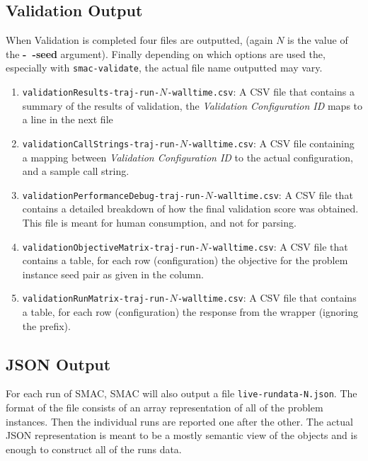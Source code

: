 \documentclass[manual.tex]{subfiles}
\begin{document}
\subsection{Validation Output}

When Validation is completed four files are outputted, (again $N$ is the value of the \textbf{-~$\!\!$-seed} argument). Finally depending on which options are used the, especially with \texttt{smac-validate}, the actual file name outputted may vary.

\begin{enumerate}
\item \texttt{validationResults-traj-run-$N$-walltime.csv}:
A CSV file that contains a summary of the results of validation, the \textit{Validation Configuration ID} maps to a line in the next file

\item \texttt{validationCallStrings-traj-run-$N$-walltime.csv}:
A CSV file containing a mapping between \textit{Validation Configuration ID} to
the actual configuration, and a sample call string.

\item \texttt{validationPerformanceDebug-traj-run-$N$-walltime.csv}:
A CSV file that contains a detailed breakdown of how the final validation score
was obtained. This file is meant for human consumption, and not for parsing.

\item \texttt{validationObjectiveMatrix-traj-run-$N$-walltime.csv}:
A CSV file that contains a table, for each row (configuration) the objective for the problem instance seed pair as given in the column.

\item \texttt{validationRunMatrix-traj-run-$N$-walltime.csv}:
A CSV file that contains a table, for each row (configuration) the response from the wrapper (ignoring the prefix).

\end{enumerate}

\subsection{JSON Output}

For each run of SMAC, SMAC will also output a file \texttt{live-rundata-N.json}. The format of the file consists of an array representation of all of the problem instances. Then the individual runs are reported one after the other. The actual JSON representation is meant to be a mostly semantic view of the objects and is enough to construct all of the runs data. 
\end{document}

